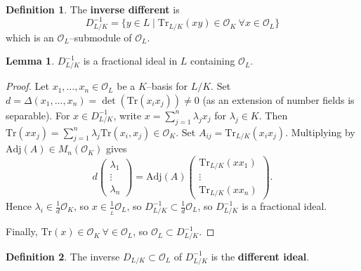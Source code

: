 \documentclass{article}
\theoremstyle{definition}
\newtheorem{lemma}[theorem]{Lemma}
\newtheorem{defn}{Definition}[section]
\begin{document}
\begin{defn}
    The \textbf{inverse different} is $$D^{-1}_{L/K} = \{y \in L \mid \text{Tr}_{L/K}(xy) \in \mathcal{O}_K ~\forall x \in \mathcal{O}_L\}$$
    which is an $\mathcal{O}_L$--submodule of $\mathcal{O}_L$.
\end{defn}
\begin{lemma}
    $D^{-1}_{L/K}$ is a fractional ideal in $L$ containing $\mathcal{O}_L$.
\end{lemma}
\begin{proof}
    Let $x_1,\ldots,x_n \in \mathcal{O}_L$ be a $K$--basis for $L/K$. Set $d = \Delta(x_1,\ldots,x_n) = \det(\text{Tr}(x_ix_j)) \neq 0$ (as an extension of number fields is separable). For $x \in D^{-1}_{L/K}$, write $x = \sum_{j=1}^{n} \lambda_j x_j$ for $\lambda_j \in K$. Then $\text{Tr}(xx_j)=\sum_{j=1}^{n} \lambda_j \text{Tr}(x_i,x_j) \in\mathcal{O}_K$. Set $A_{ij} = \text{Tr}_{L/K}(x_i x_j)$. Multiplying by $\text{Adj}(A) \in M_{n}(\mathcal{O}_K)$ gives \[
    d \begin{pmatrix} \lambda_1 \\ \vdots \\ \lambda_n \end{pmatrix} = \text{Adj}(A) \begin{pmatrix} \text{Tr}_{L/K}(x x_1) \\ \vdots \\ \text{Tr}_{L/K}(x x_n) \end{pmatrix}.
    \]
    Hence $\lambda_i \in \frac{1}{d}\mathcal{O}_K$, so $x \in \frac{1}{_L} \mathcal{O}_L$, so $D^{-1}_{L/K} \subset \frac{1}{d}\mathcal{O}_L$, so $D^{-1}_{L/K}$ is a fractional ideal.
    \vspace{1mm}
     
    Finally, $\text{Tr}(x) \in \mathcal{O}_K ~\forall \in \mathcal{O}_L$, so $\mathcal{O}_L \subset D^{-1}_{L/K}$.
\end{proof}
\begin{defn}
    The inverse $D_{L/K} \subset \mathcal{O}_L$ of $D^{-1}_{L/K}$ is the \textbf{different ideal}.
\end{defn}
\end{document}
